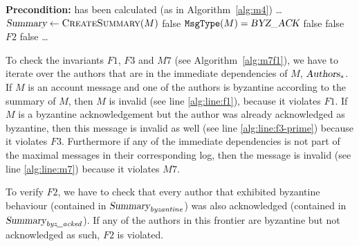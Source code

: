 \documentclass{article}
\begin{document}
\begin{algorithm}[ht]
\caption{Code snippet verifying $M7$, $F1$, $F2$, and $F3$}
\label{alg:m7f1}
\begin{algorithmic}
    \Statex \textbf{Precondition:}  has been calculated (as in Algorithm~\ref{alg:m4})
    \Statex \ldots \vphantom{I}
    \State $\var{Summary} \gets \Call{CreateSummary}{M}$
             
                \State \Return false
                \label{alg:line:f1}
            \EndIf
        \Else \Comment $\texttt{MsgType}(M) = \textsl{BYZ\_ACK}$
             
                \State \Return false
                \label{alg:line:f3-prime}
            \EndIf
        \EndIf
         
            \label{alg:line:m7}
            \State \Return false
        \EndIf
    \EndFor
     \Comment $F2$
            \State \Return false
        \EndIf
    \EndIf
    \Statex \ldots \vphantom{I}
\end{algorithmic}
\end{algorithm}
To check the invariants $F1$, $F3$ and $M7$ (see Algorithm~\ref{alg:m7f1}), we have to iterate over the authors that are in the immediate dependencies of $M$, $\textsl{Authors}_*$. If $M$ is an account message and one of the authors is byzantine according to the summary of $M$, then $M$ is invalid (see line \ref{alg:line:f1}), because it violates $F1$.
If $M$ is a byzantine acknowledgement but the author was already acknowledged as byzantine, then this message is invalid as well (see line \ref{alg:line:f3-prime}) because it violates $F3$.
Furthermore if any of the immediate dependencies is not part of the maximal messages in their corresponding log, then the message is invalid (see line \ref{alg:line:m7}) because it violates $M7$.

To verify $F2$, we have to check that every author that exhibited byzantine behaviour (contained in $\textsl{Summary}_\emph{byzantine}$) was also acknowledged (contained in $\textsl{Summary}_\emph{byz\_acked}$). If any of the authors in this frontier are byzantine but not acknowledged as such, $F2$ is violated.
\end{document}
